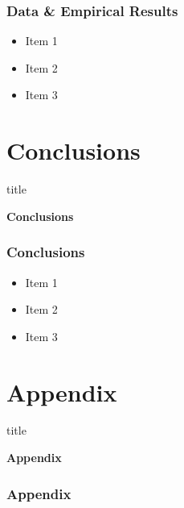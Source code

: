 \documentclass[11pt]{beamer}
\begin{document}
	\begin{frame}
		
		\frametitle{\bfseries Data \& Empirical Results}
		\begin{itemize}
			\item Item 1
			\item Item 2
			\item Item 3
		\end{itemize}
	\end{frame}
	
	\section[Conclusions]{Conclusions}
	\begin{frame}
		\begin{beamercolorbox}{title}
			\begin{center}
				\bfseries \huge Conclusions
			\end{center}	
		\end{beamercolorbox}
		
	\end{frame}
	
	\begin{frame}
		
		\frametitle{\bfseries Conclusions}
		\begin{itemize}
			\item Item 1
			\item Item 2
			\item Item 3
		\end{itemize}
	\end{frame}
	
	\section[Appendix]{Appendix}
	\begin{frame}
		\begin{beamercolorbox}{title}
			\begin{center}
				\bfseries \huge Appendix
			\end{center}	
		\end{beamercolorbox}
		
	\end{frame}
	
	\begin{frame}
		
		\frametitle{\bfseries Appendix}
	\end{frame}
	
	
\end{document}
